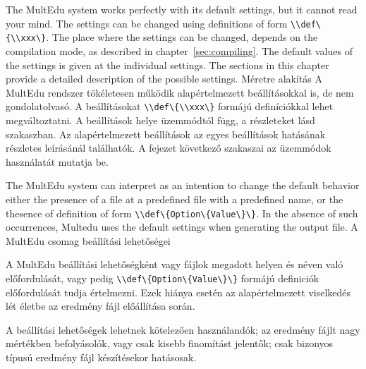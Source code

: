 





{
The MultEdu system works perfectly with its default settings, but it cannot read your mind.
The settings can be changed using definitions of form \lstinline|\\def\{\\xxx\}|.
The place where the settings can be changed, depends on the compilation mode,
as described in chapter~\ref{sec:compiling}. The default values of the settings
is given at the individual settings.
The sections in this chapter provide a detailed description of the possible settings.
}
{Méretre alakítás}
{
A MultEdu rendszer tökéletesen működik alapértelmezett beállításokkal is,
de nem gondolatolvasó. A beállításokat \lstinline|\\def\{\\xxx\}| formájú definíciókkal
lehet megváltoztatni. A beállítások helye üzemmódtól függ,
a részleteket lásd ~ szakaszban. 
Az alapértelmezett beállítások az egyes beállítások hatásának részletes 
leírásánál találhatók.
A fejezet következő szakaszai 
az üzemmódok használatát mutatja be.
}



{
The MultEdu system can interpret as an intention to change the default
behavior either the presence of a file at a predefined file with a predefined name,
or the thesence of definition of form \lstinline|\\def\{Option\{Value\}\}|.
In the absence of such occurrences, Multedu uses the default settings 
when generating the output file.
}
{A MultEdu csomag beállítási lehetőségei}
{
A MultEdu beállítási lehetőségként vagy fájlok megadott helyen és néven 
való előfordulását, vagy pedig \lstinline|\\def\{Option\{Value\}\}| formájú definiciók előfordulását tudja értelmezni. Ezek hiánya esetén az alapértelmezett
viselkedés lét életbe az eredmény fájl előállítása során. 

A beállítási lehetőségek lehetnek kötelezően használandók;
az eredmény fájlt nagy mértékben befolyásolók, vagy csak kisebb
finomítást jelentők;
csak bizonyos típusú eredmény fájl készítésekor hatásosak.
}


